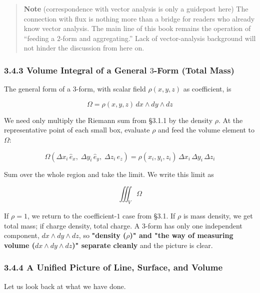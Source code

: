 \documentclass[a4paper,12pt,openany]{book}
\begin{document}
\begin{quote}
\textbf{Note} (correspondence with vector analysis is only a guidepost
here) The connection with flux is nothing more than a bridge for readers
who already know vector analysis. The main line of this book remains the
operation of ``feeding a \(2\)-form and aggregating.'' Lack of
vector-analysis background will not hinder the discussion from here on.
\end{quote}

\hypertarget{volume-integral-of-a-general-3-form-total-mass}{%
\subsubsection{\texorpdfstring{3.4.3 Volume Integral of a General
\(3\)-Form (Total
Mass)}{3.4.3 Volume Integral of a General 3-Form (Total Mass)}}\label{volume-integral-of-a-general-3-form-total-mass}}

The general form of a \(3\)-form, with scalar field \(\rho(x,y,z)\) as
coefficient, is

\[\Omega = \rho(x,y,z)\,dx \wedge dy \wedge dz\]

We need only multiply the Riemann sum from §3.1.1 by the density
\(\rho\). At the representative point of each small box, evaluate
\(\rho\) and feed the volume element to \(\Omega\):

\[\Omega(\Delta x_i\,\hat{e}_x,\; \Delta y_i\,\hat{e}_y,\; \Delta z_i\,\hat{e}_z) = \rho(x_i,y_i,z_i)\,\Delta x_i\,\Delta y_i\,\Delta z_i\]

Sum over the whole region and take the limit. We write this limit as

\[\iiint_V \Omega\]

If \(\rho=1\), we return to the coefficient-\(1\) case from §3.1. If
\(\rho\) is mass density, we get total mass; if charge density, total
charge. A \(3\)-form has only one independent component,
\(dx \wedge dy \wedge dz\), so
\textbf{"density ($\rho$)" and "the way of measuring volume ($dx \wedge dy \wedge dz$)" separate cleanly}
and the picture is clear.

\hypertarget{a-unified-picture-of-line-surface-and-volume}{%
\subsubsection{3.4.4 A Unified Picture of Line, Surface, and
Volume}\label{a-unified-picture-of-line-surface-and-volume}}

Let us look back at what we have done.
\end{document}
